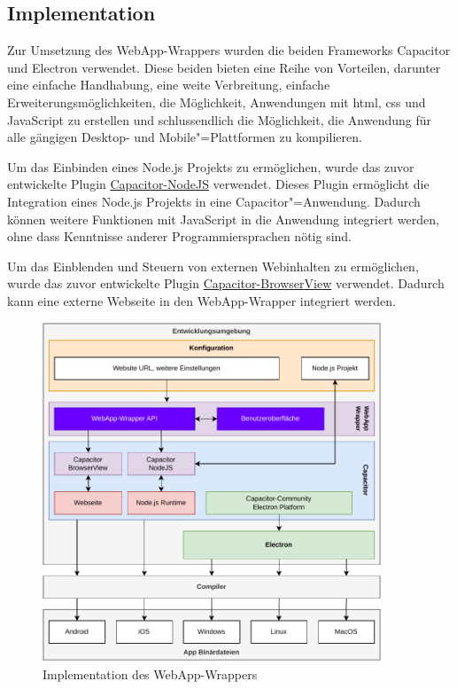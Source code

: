 \subsection{Implementation}

Zur Umsetzung des WebApp-Wrappers wurden die beiden Frameworks Capacitor und Electron verwendet.
Diese beiden bieten eine Reihe von Vorteilen, darunter eine einfache Handhabung, eine weite Verbreitung, einfache Erweiterungsmöglichkeiten, die Möglichkeit, Anwendungen mit \ac{html}, \ac{css} und JavaScript zu erstellen und schlussendlich die Möglichkeit, die Anwendung für alle gängigen Desktop- und Mobile"=Plattformen zu kompilieren.
\cite{capacitor:docs, electron:docs}

Um das Einbinden eines Node.js Projekts zu ermöglichen, wurde das zuvor entwickelte Plugin \hyperref[sec:Capacitor-NodeJS]{Capacitor-NodeJS} verwendet.
Dieses Plugin ermöglicht die Integration eines Node.js Projekts in eine Capacitor"=Anwendung.
Dadurch können weitere Funktionen mit JavaScript in die Anwendung integriert werden, ohne dass Kenntnisse anderer Programmiersprachen nötig sind.

Um das Einblenden und Steuern von externen Webinhalten zu ermöglichen, wurde das zuvor entwickelte Plugin \hyperref[sec:Capacitor-BrowserView]{Capacitor-BrowserView} verwendet.
Dadurch kann eine externe Webseite in den WebApp-Wrapper integriert werden.

\begin{figure}[H]
  \centering
  \includegraphics[width=0.9\textwidth]{assets/04_WebApp-Wrapper/01_Implementation.drawio.pdf}
  \caption[WebApp-Wrapper / Implementation]{Implementation des WebApp-Wrappers}
  \label{asset:WebApp-Wrapper:Implementation}
\end{figure}

